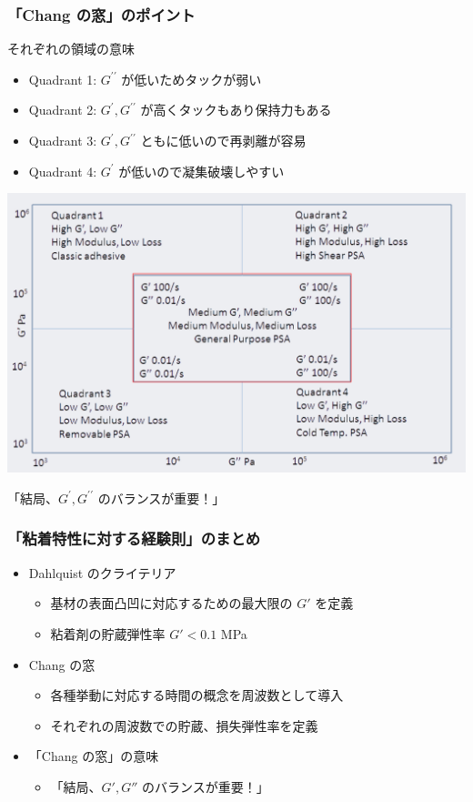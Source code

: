\documentclass[12pt, dvipdfmx]{beamer}
\begin{document}
\begin{frame}
	\frametitle{「Chang の窓」のポイント}
	\begin{exampleblock}{それぞれの領域の意味}
		\begin{itemize}
			\item Quadrant 1: $G^{\prime \prime}$ が低いためタックが弱い
			\item Quadrant 2: $G^{\prime}, G^{\prime \prime}$ が高くタックもあり保持力もある
			\item Quadrant 3: $G^{\prime}, G^{\prime \prime}$ ともに低いので再剥離が容易
			\item Quadrant 4: $G^{\prime}$ が低いので凝集破壊しやすい
		\end{itemize}

		\vspace{3mm}
		\centering
			\includegraphics[width=.4\textwidth]{ChangFrequencies_2.png}

			\large
			\alert{「結局、$G^{\prime}, G^{\prime \prime}$ のバランスが重要！」}
	\end{exampleblock}	
\end{frame}

\begin{frame}
	\frametitle{「粘着特性に対する経験則」のまとめ}
        \begin{boxnote}
            \vspace{-3mm}
            \begin{itemize}
                \item Dahlquist のクライテリア
                    \begin{itemize}
                        \item 基材の表面凸凹に対応するための最大限の $G'$ を定義
                        \item 粘着剤の貯蔵弾性率 $G' < 0.1$ MPa
                    \end{itemize} 
                \item Chang の窓
                    \begin{itemize}
                        \item 各種挙動に対応する時間の概念を周波数として導入
                        \item それぞれの周波数での貯蔵、損失弾性率を定義
                    \end{itemize} 
                \item 「Chang の窓」の意味
                    \begin{itemize}
                        \item 「結局、$G', G''$ のバランスが重要！」
                    \end{itemize}
            \end{itemize}
        \end{boxnote}
\end{frame}
\end{document}

